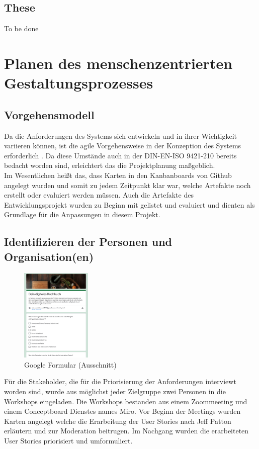 \subsection{These}
To be done
\section{Planen des menschenzentrierten Gestaltungsprozesses}
\subsection{Vorgehensmodell}
Da die Anforderungen des Systems sich entwickeln und in ihrer Wichtigkeit variieren können, ist die agile Vorgehensweise in
der Konzeption des Systems erforderlich \citep[vgl. {``Agile methods are adaptive rather than predictive.''}]{TheNewMe5:online}. Da diese Umstände auch in der DIN-EN-ISO 9421-210\citep{DINISO_2010} bereits bedacht worden sind, erleichtert das die Projektplanung maßgeblich.\\
Im Wesentlichen heißt das, dass Karten in den Kanbanboards von Github angelegt wurden und somit zu jedem Zeitpunkt klar war, welche Artefakte noch erstellt oder evaluiert werden müssen. Auch die Artefakte des Entwicklungsprojekt wurden zu Beginn mit gelistet und evaluiert und dienten als Grundlage für die Anpassungen in diesem Projekt. \\

\subsection{Identifizieren der Personen und Organisation(en)}
\begin{figure}
  \centering
    \includegraphics[width=0.3\textwidth]{images/umfrage.png}
  \centering
\caption[Google Formular (Ausschnitt)]{Google Formular (Ausschnitt)}
\label{fig:googleforms}
\end{figure}
Für die Stakeholder, die für die Priorisierung der Anforderungen interviewt worden sind, wurde aus möglichst jeder Zielgruppe zwei Personen in die Workshops eingeladen. Die Workshops bestanden aus einem Zoommeeting und einem Conceptboard Dienstes names Miro. Vor Beginn der Meetings wurden Karten angelegt welche die Erarbeitung der User Stories nach Jeff Patton\citep{Patton_2014} erläutern und zur Moderation beitrugen. Im Nachgang wurden die erarbeiteten User Stories priorisiert und umformuliert. \\

